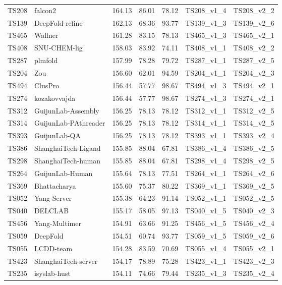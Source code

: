 \begin{longtable}{lllllll}
TS208 & falcon2 & 164.13 & 86.01 & 78.12 & TS208\_v1\_4 & TS208\_v2\_2 \\ 
TS139 & DeepFold-refine & 162.13 & 68.36 & 93.77 & TS139\_v1\_3 & TS139\_v2\_6 \\ 
TS465 & Wallner & 161.28 & 83.15 & 78.13 & TS465\_v1\_3 & TS465\_v2\_1 \\ 
TS408 & SNU-CHEM-lig & 158.03 & 83.92 & 74.11 & TS408\_v1\_1 & TS408\_v2\_2 \\ 
TS287 & plmfold & 157.99 & 78.28 & 79.72 & TS287\_v1\_1 & TS287\_v2\_5 \\ 
TS204 & Zou & 156.60 & 62.01 & 94.59 & TS204\_v1\_1 & TS204\_v2\_3 \\ 
TS494 & ClusPro & 156.44 & 57.77 & 98.67 & TS494\_v1\_3 & TS494\_v2\_1 \\ 
TS274 & kozakovvajda & 156.44 & 57.77 & 98.67 & TS274\_v1\_3 & TS274\_v2\_1 \\ 
TS312 & GuijunLab-Assembly & 156.25 & 78.13 & 78.12 & TS312\_v1\_1 & TS312\_v2\_5 \\ 
TS314 & GuijunLab-PAthreader & 156.25 & 78.13 & 78.12 & TS314\_v1\_1 & TS314\_v2\_5 \\ 
TS393 & GuijunLab-QA & 156.25 & 78.13 & 78.12 & TS393\_v1\_1 & TS393\_v2\_4 \\ 
TS386 & ShanghaiTech-Ligand & 155.85 & 88.04 & 67.81 & TS386\_v1\_4 & TS386\_v2\_5 \\ 
TS298 & ShanghaiTech-human & 155.85 & 88.04 & 67.81 & TS298\_v1\_4 & TS298\_v2\_5 \\ 
TS264 & GuijunLab-Human & 155.64 & 78.13 & 77.51 & TS264\_v1\_1 & TS264\_v2\_6 \\ 
TS369 & Bhattacharya & 155.60 & 75.37 & 80.22 & TS369\_v1\_1 & TS369\_v2\_5 \\ 
TS052 & Yang-Server & 155.38 & 64.23 & 91.14 & TS052\_v1\_1 & TS052\_v2\_5 \\ 
TS040 & DELCLAB & 155.17 & 58.05 & 97.13 & TS040\_v1\_5 & TS040\_v2\_3 \\ 
TS456 & Yang-Multimer & 154.91 & 63.66 & 91.25 & TS456\_v1\_5 & TS456\_v2\_4 \\ 
TS059 & DeepFold & 154.51 & 60.74 & 93.77 & TS059\_v1\_5 & TS059\_v2\_6 \\ 
TS055 & LCDD-team & 154.28 & 83.59 & 70.69 & TS055\_v1\_4 & TS055\_v2\_1 \\ 
TS423 & ShanghaiTech-server & 154.17 & 78.89 & 75.28 & TS423\_v1\_1 & TS423\_v2\_3 \\ 
TS235 & isyslab-hust & 154.11 & 74.66 & 79.44 & TS235\_v1\_3 & TS235\_v2\_4 \\ 

\end{longtable}
